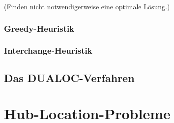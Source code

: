       (Finden nicht notwendigerweise eine optimale Lösung.)

      \par \textbf{}
      

      \subsubsection{Greedy-Heuristik}

      \subsubsection{Interchange-Heuristik}


    \subsection{Das DUALOC-Verfahren} %
    \label{sub:das_dualoc_verfahren}
    


  \section{Hub-Location-Probleme} %
  \label{sec:hub_location_probleme}
  

    



